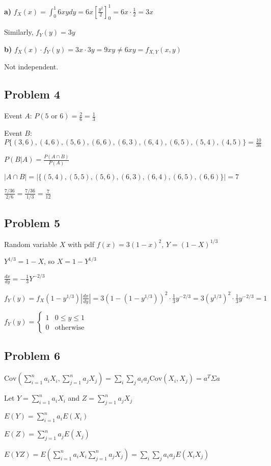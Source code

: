 \documentclass{article}
\begin{document}
\textbf{a)} $f_X(x) = \int_0^1 6xy dy = 6x \left[\frac{y^2}{2}\right]_0^1 = 6x \cdot \frac{1}{2} = 3x$

Similarly, $f_Y(y) = 3y$

\textbf{b)} $f_X(x) \cdot f_Y(y) = 3x \cdot 3y = 9xy \neq 6xy = f_{X,Y}(x,y)$

Not independent.

\subsection*{Problem 4}
Event $A$: $P(5 \text{ or } 6) = \frac{2}{6} = \frac{1}{3}$

Event $B$: $P\{(3,6), (4,6), (5,6), (6,6), (6,3), (6,4), (6,5), (5,4), (4,5)\} = \frac{10}{36}$

$P(B|A) = \frac{P(A \cap B)}{P(A)}$

$|A \cap B| = |\{(5,4), (5,5), (5,6), (6,3), (6,4), (6,5), (6,6)\}| = 7$

$\frac{7/36}{2/6} = \frac{7/36}{1/3} = \frac{7}{12}$

\subsection*{Problem 5}
Random variable $X$ with pdf $f(x) = 3(1-x)^2$, $Y = (1-X)^{1/3}$

$Y^{1/3} = 1-X$, so $X = 1-Y^{1/3}$

$\frac{dx}{dy} = -\frac{1}{3}Y^{-2/3}$

$f_Y(y) = f_X(1-y^{1/3}) \left|\frac{dx}{dy}\right| = 3(1-(1-y^{1/3}))^2 \cdot \frac{1}{3}y^{-2/3} = 3(y^{1/3})^2 \cdot \frac{1}{3}y^{-2/3} = 1$

$f_Y(y) = \begin{cases} 1 & 0 \leq y \leq 1 \\ 0 & \text{otherwise} \end{cases}$

\subsection*{Problem 6}
$\text{Cov}\left(\sum_{i=1}^n a_i X_i, \sum_{j=1}^n a_j X_j\right) = \sum_i \sum_j a_i a_j \text{Cov}(X_i, X_j) = a^T \Sigma a$

Let $Y = \sum_{i=1}^n a_i X_i$ and $Z = \sum_{j=1}^n a_j X_j$

$E(Y) = \sum_{i=1}^n a_i E(X_i)$

$E(Z) = \sum_{j=1}^n a_j E(X_j)$

$E(YZ) = E\left(\sum_{i=1}^n a_i X_i \sum_{j=1}^n a_j X_j\right) = \sum_i \sum_j a_i a_j E(X_i X_j)$
\end{document}
